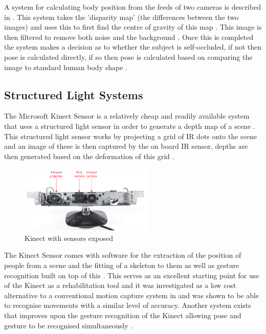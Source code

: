 \documentclass[journal]{IEEEtran}
\begin{document}
A system for calculating body position from the feeds of two cameras is described in \cite{StereoCamera}. This 
system takes the 'disparity map' (the differences between the two images) and uses this to first find 
the centre of gravity of this map \cite{StereoCamera}. This image is then filtered to remove both noise 
and the background \cite{StereoCamera}. Once this is completed the system makes a decision as to whether 
the subject is self-occluded, if not then pose is calculated directly, if so then pose is calculated 
based on comparing the image to standard human body shape \cite{StereoCamera}.

\subsection{Structured Light Systems}
The Microsoft Kinect Sensor is a relatively cheap and readily available system that uses a structured 
light sensor in order to generate a depth map of a scene \cite{Kinect}. This structured light sensor 
works by projecting a grid of IR dots onto the scene and an image of these is then captured by the 
on board IR sensor, depths are then generated based on the deformation of this grid \cite{Kinect}.

\begin{figure}[!h]
\centering
\includegraphics[width=2.5in]{kinect.png}
\caption{Kinect with sensors exposed \cite{Kinect}}
\label{kinect_fig}
\end{figure}

The Kinect Sensor comes with software for the extraction of the position of people from a scene and 
the fitting of a skeleton to them as well as gesture recognition built on top of this \cite{Kinect,kinect1}. 
This serves as an excellent starting point for use of the Kinect as a rehabilitation tool and it was 
investigated as a low cost alternative to a conventional motion capture system in \cite{kinect1} and was 
shown to be able to recognise movements with a similar level of accuracy. Another system exists that 
improves upon the gesture recognition of the Kinect allowing pose and gesture to be recognised 
simultaneously \cite{kinectGesture}.
\end{document}
